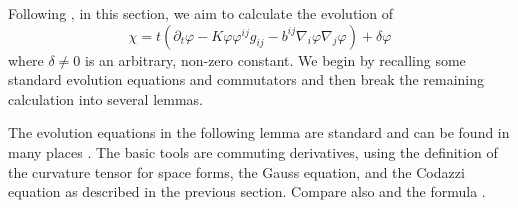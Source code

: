 \documentclass{amsart}
\begin{document}
Following \cite{MR1316556, MR1100812, MR1296393, MR1480081}, in this section, we aim to calculate the evolution of
\[
\chi =t(\partial_t \varphi - K \varphi \varphi^{ij} g_{ij} - b^{ij} \nabla_i \varphi \nabla_j \varphi) +\delta\varphi
\]
where \(\delta \ne 0\) is an arbitrary, non-zero constant. We begin by recalling some standard evolution equations and commutators and then break the remaining calculation into several lemmas.

The evolution equations in the following lemma are standard and can be found in many places \cite{MR892052, MR1316556, MR1100812, MR1296393, MR1480081}. The basic tools are commuting derivatives, using the definition of the curvature tensor for space forms, the Gauss equation, and the Codazzi equation as described in the previous section. Compare also \cite[p.~94-95]{Gerhardt:/2006} and the formula \cite[eq.~(6.17)]{Gerhardt:01/1996}.
\end{document}

